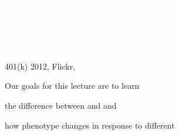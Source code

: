 \documentclass[t]{beamer}
\begin{document}
{
\begin{frame}[b]
\hfill\textcolor{white}{\tiny Guido Bohne, Flickr }
\end{frame}
}
%
{
\begin{frame}[b]
\textcolor{white}{\tiny Michael S. Taylor, }
\end{frame}
}
%
{
\begin{frame}[b]
\hfill\textcolor{white}{\tiny Ian Carroll, Flickr, }
\end{frame}
}
%
{
\begin{frame}[b]
\hfill\tiny 401(k) 2012, Flickr, 
\end{frame}
}
%
{
\begin{frame}[b]
\end{frame}
}
%


%
\begin{frame}[t]{Our goals for this lecture are to learn}

	
	\hangpara	the difference between  and  and

	\hangpara how phenotype changes in response to different 
	
\end{frame}

%
%
\end{document}
